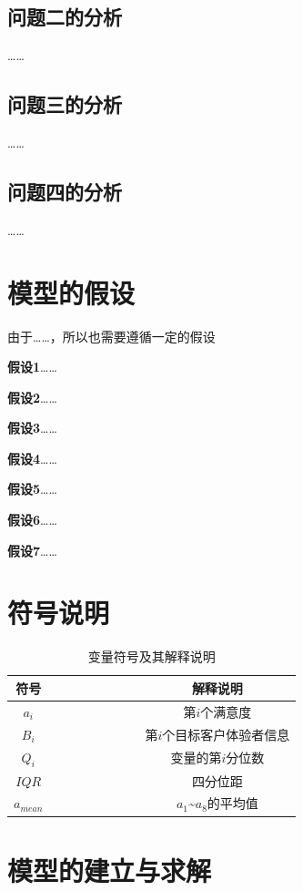 \documentclass{JXUSTmodeling}
\begin{document}
\subsection{问题二的分析}\label{sub:2.3}
……
\subsection{问题三的分析}\label{sub:2.4}
……
\subsection{问题四的分析}\label{sub:2.5}
……

\section{模型的假设}\label{sec:3}
由于……，所以也需要遵循一定的假设

\textbf{假设1}……

\textbf{假设2}……

\textbf{假设3}……

\textbf{假设4}……

\textbf{假设5}……

\textbf{假设6}……

\textbf{假设7}……



\section{符号说明}\label{sec:4}
\begin{table}[htbp]
	\centering 
	\caption{\label{tab:symbol}变量符号及其解释说明}
	\begin{tabular}{ccccccccc}
		\toprule[2pt]
		符号 &&&&&&&& 解释说明 \\
		\midrule
		$a_{i}$ &&&&&&&& 第$ i $个满意度\\
		$B_{i}$ &&&&&&&& 第$ i$个目标客户体验者信息\\
		$Q_{i}$ &&&&&&&& 变量的第$ i$分位数\\
		$IQR$ &&&&&&&& 四分位距\\
		$a_{mean}$ &&&&&&&& $ a_{1} $\~{}$ a_{8} $的平均值\\
	
		\bottomrule[2pt]

	\end{tabular}
\end{table}
\section{模型的建立与求解}\label{sec:5}
\end{document}
